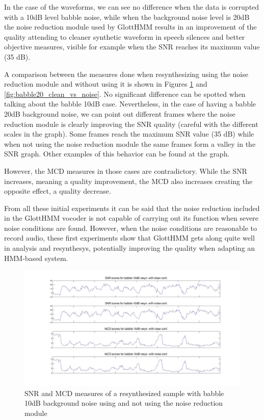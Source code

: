 In the case of the waveforms, we can see no difference when the data is corrupted with a 10dB level babble noise, while when the background noise level is 20dB the noise reduction module used by GlottHMM results in an improvement of the quality attending to cleaner synthetic waveform in speech silences and better objective measures, visible for example when the SNR reaches its maximum value (35 dB). 

A comparison between the measures done when resynthesizing using the noise reduction module and without using it is shown in Figures \ref{fig:babble10_clean_vs_noise} and \ref{fig:babble20_clean_vs_noise}. 
%
No significant difference can be spotted when talking about the babble 10dB case.
%
Nevertheless, in the case of having a babble 20dB background noise, we can point out different frames where the noise reduction module is clearly improving the SNR quality (careful with the different scales in the graph).
%
Some frames reach the maximum SNR value (35 dB) while when not using the noise reduction module the same frames form a valley in the SNR graph.
%
Other examples of this behavior can be found at the graph.

However, the MCD measures in those cases are contradictory. 
%
While the SNR increases, meaning a quality improvement, the MCD also increases creating the opposite effect, a quality decrease.

From all these initial experiments it can be said that the noise reduction included in the GlottHMM vocoder is not capable of carrying out its function when severe noise conditions are found.
%
However, when the noise conditions are reasonable to record audio, these first experiments show that GlottHMM gets along quite well in analysis and resynthesys, potentially improving the quality when adapting an HMM-based system. 

\begin{figure}[!htb]
\begin{adjustwidth}{-2.6cm}{}
\includegraphics[width=1.3\textwidth]{images/babble10clean_vs_noise.jpg}
\end{adjustwidth}
\caption{SNR and MCD measures of a resynthesized sample with babble 10dB background noise using and not using the noise reduction module}
\label{fig:babble10_clean_vs_noise}
\end{figure}

